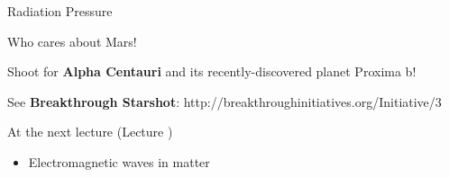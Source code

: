%
%
%

\begin{frame}{Radiation Pressure}

Who cares about Mars!\\
\vspace{0.2cm}

Shoot for {\bf Alpha Centauri} and its recently-discovered planet Proxima b!
\vspace{0.2cm}

See {\bf Breakthrough Starshot}:
{\color{blue}http://breakthroughinitiatives.org/Initiative/3}\\

\end{frame}


%
%

\renewcommand{\lecturesummarytitle}{Main points to remember }


%
%

\begin{frame}{At the next lecture (Lecture \nextlecture)}

\begin{itemize}
\item Electromagnetic waves in matter
\end{itemize}

\end{frame}

%
%



